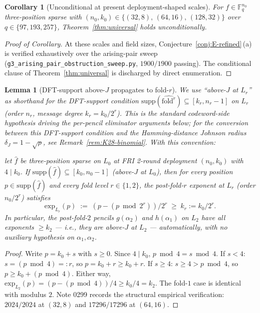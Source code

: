 \documentclass[11pt]{article}
\newtheorem{lemma}[theorem]{Lemma}
\newtheorem{corollary}[theorem]{Corollary}
\theoremstyle{definition}
\theoremstyle{remark}
\newcommand{\FF}{\mathbb{F}}
\begin{document}
\begin{corollary}[Unconditional at present deployment-shaped scales]
\label{cor:univ-deployment}
For $f \in \FF_q^{n_0}$ three-position sparse with
$(n_0, k_0) \in \{(32, 8),\, (64, 16),\, (128, 32)\}$ over
$q \in \{97, 193, 257\}$, Theorem~\ref{thm:universal} holds
\emph{unconditionally}.
\end{corollary}

\begin{proof}[Proof of Corollary]
At these scales and field sizes,
Conjecture~\ref{conj:E-refined}\,(a) is verified exhaustively over the
arising-pair sweep (\texttt{g3\_arising\_pair\_obstruction\_sweep.py},
$1900 / 1900$ passing). The conditional clause of
Theorem~\ref{thm:universal} is discharged by direct enumeration.
\end{proof}


\begin{lemma}[DFT-support above-$J$ propagates to fold-$r$]
\label{lem:above-J-lifts}
We use ``\emph{above-$J$ at $L_r$}'' as shorthand for the DFT-support
condition $\mathrm{supp}(\widehat{\mathrm{fold}^r}) \subseteq [k_r, n_r-1]$
on $L_r$ (order $n_r$, message degree $k_r = k_0/2^r$). This is the
standard codeword-side hypothesis driving the per-pencil eliminator
arguments below; for the conversion between this DFT-support condition
and the Hamming-distance Johnson radius $\delta_J = 1 - \sqrt{\rho}$, see
Remark~\ref{rem:K28-binomial}. With this convention:

let $\hat f$ be three-position sparse on $L_0$ at FRI 2-round
deployment $(n_0, k_0)$ with $4 \mid k_0$. If
$\mathrm{supp}(\hat f) \subseteq [k_0, n_0 - 1]$ (\emph{above-$J$ at
$L_0$}), then for every position $p \in \mathrm{supp}(\hat f)$ and every
fold level $r \in \{1, 2\}$, the post-fold-$r$ exponent at
$L_r$ (order $n_0/2^r$) satisfies
\[
 \mathrm{exp}_{L_r}(p) \;:=\; (p - (p \bmod 2^r)) / 2^r \;\geq\; k_r := k_0/2^r.
\]
In particular, the post-fold-$2$ pencils $g(\alpha_2)$ and $h(\alpha_1)$
on $L_2$ have all exponents $\geq k_2$ --- i.e., they are above-$J$ at
$L_2$ --- automatically, with no auxiliary hypothesis on
$\alpha_1, \alpha_2$.
\end{lemma}

\begin{proof}
Write $p = k_0 + s$ with $s \geq 0$. Since $4 \mid k_0$,
$p \bmod 4 = s \bmod 4$. If $s < 4$: $s = (p \bmod 4) =: r$, so
$p = k_0 + r \geq k_0 + r$. If $s \geq 4$: $s \geq 4 > p \bmod 4$, so
$p \geq k_0 + (p \bmod 4)$. Either way,
$\mathrm{exp}_{L_2}(p) = (p - (p \bmod 4))/4 \geq k_0/4 = k_2$. The
fold-$1$ case is identical with modulus $2$. Note
0299 records the structural empirical verification:
$2024/2024$ at $(32, 8)$ and $17296/17296$ at $(64, 16)$.
\end{proof}
\end{document}
